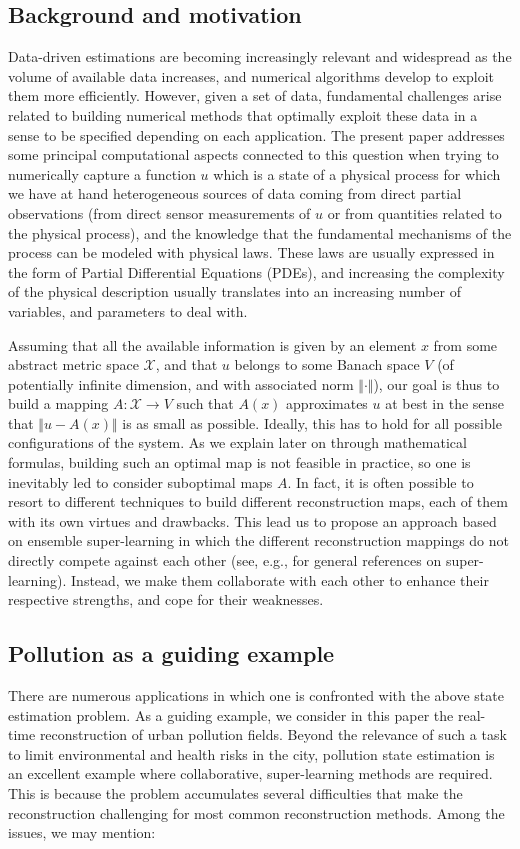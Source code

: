 \documentclass[11pt,a4paper,twoside]{article}
\theoremstyle{definition}
\numberwithin{equation}{section}
\newcommand{\cX}{\ensuremath{\mathcal{X}}}
\newcommand{\<}{\langle}
\renewcommand{\>}{\rangle}
\begin{document}
\subsection{Background and motivation}
Data-driven estimations are becoming increasingly relevant and widespread as the volume of available data increases, and numerical algorithms develop to exploit them more efficiently. However, given a set of data, fundamental challenges arise related to building numerical methods that optimally exploit these data in a sense to be specified depending on each application. The present paper addresses some principal computational aspects connected to this question when trying to numerically capture a function $u$ which is a state of a physical process for which we have at hand heterogeneous sources of data coming from direct partial observations (from direct sensor measurements of $u$ or from quantities related to the physical process), and the knowledge that the fundamental mechanisms of the process can be modeled with physical laws. These laws are usually expressed in the form of Partial Differential Equations (PDEs), and increasing the complexity of the physical description usually translates into an increasing number of variables, and parameters to deal with.

Assuming that all the available information is given by an element $x$ from some abstract metric space $\cX$, and that $u$ belongs to some Banach space $V$ (of potentially infinite dimension, and with associated norm $\Vert\cdot\Vert$), our goal is thus to build a mapping $A:\cX\to V$ such that $A(x)$ approximates $u$ at best in the sense that $\Vert u - A(x)\Vert$ is as small as possible. Ideally, this has to hold for all possible configurations of the system. As we explain later on through mathematical formulas, building such an optimal map is not feasible in practice, so one is inevitably led to consider suboptimal maps $A$. In fact, it is often possible to resort to different techniques to build different reconstruction maps, each of them with its own virtues and drawbacks. This lead us to propose an approach based on ensemble super-learning in which the different reconstruction mappings do not directly compete against each other (see, e.g., \cite{Breiman1996, LPH2007, PL2010} for general references on super-learning). Instead, we make them collaborate with each other to enhance their respective strengths, and cope for their weaknesses.


\subsection{Pollution as a guiding example}
There are numerous applications in which one is confronted with the above state estimation problem. As a guiding example, we consider in this paper the real-time reconstruction of urban pollution fields. Beyond the relevance of such a task to limit environmental and health risks in the city, pollution state estimation is an excellent example where collaborative, super-learning methods are required. This is because the problem accumulates several difficulties that make the reconstruction challenging for most common reconstruction methods. Among the issues, we may mention:
\end{document}

